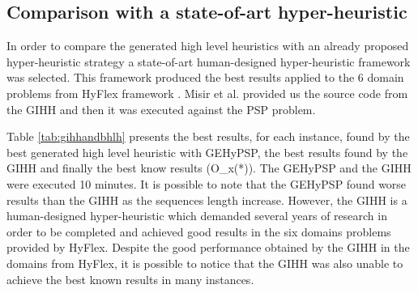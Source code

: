 	\begin{table}[]
		\centering
		\caption{Results from the best individual found in GEHyPSP-3}
		\label{bestGExp3}
	\end{table}
	
	
	
	
	\subsection{Comparison with a state-of-art hyper-heuristic}
	In order to compare the generated high level heuristics with an already proposed hyper-heuristic strategy a state-of-art human-designed hyper-heuristic framework \cite{misir2012intelligent} was selected. This framework produced the best results applied to the 6 domain problems from HyFlex framework \cite{ochoa2012hyflex}. Misir et al. \cite{misir2012intelligent} provided us the source code from the GIHH and then it was executed against the PSP problem. 
	
	Table \ref{tab:gihhandbhlh} presents the best results, for each instance, found by the best generated high level heuristic with GEHyPSP, the best results found by the GIHH \cite{misir2012intelligent} and finally the best know results (O_x(*)). The GEHyPSP and the GIHH were executed 10 minutes. It is possible to note that the GEHyPSP found worse results than the GIHH as the sequences length increase. However, the GIHH is a human-designed hyper-heuristic which demanded several years of research in order to be completed and achieved good results in the six domains problems provided by HyFlex. Despite the good performance obtained by the GIHH in the domains from HyFlex, it is possible to notice that the GIHH was also unable to achieve the best known results in many instances.
	
